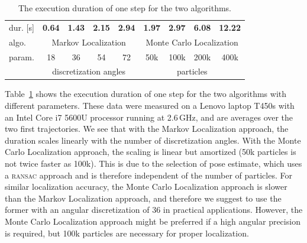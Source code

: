 \documentclass[letterpaper, 10pt, conference]{ieeeconf}
\newcommand{\Fig}[1]{Figure~\ref{fig:#1}}
\newcommand{\Tbl}[1]{{Table}~\ref{fig:#1}}
\begin{document}

\begin{table}
\noindent \begin{tabularx}{\columnwidth}{lcccc|cccc}
\toprule
dur. [s] & \textbf{0.64} & \textbf{1.43} & \textbf{2.15} & \textbf{2.94} & \textbf{1.97} & \textbf{2.97} & \textbf{6.08} & \textbf{12.22} \\
algo. & \multicolumn{4}{c}{Markov Localization} & \multicolumn{4}{c}{Monte Carlo Localization} \\
param. & 18 & 36 & 54 & 72 & 50k & 100k & 200k & 400k \\
& \multicolumn{4}{c}{discretization angles} & \multicolumn{4}{c}{particles} \\
\bottomrule
\end{tabularx}
\caption{The execution duration of one step for the two algorithms.}
\label{fig:cpuload}
\end{table}

\Tbl{cpuload} shows the execution duration of one step for the two algorithms with different parameters.
These data were measured on a Lenovo laptop T450s with an Intel Core i7 5600U processor running at 2.6\,GHz, and are averages over the two first trajectories.
We see that with the Markov Localization approach, the duration scales linearly with the number of discretization angles.
With the Monte Carlo Localization approach, the scaling is linear but amortized (50k particles is not twice faster as 100k).
This is due to the selection of pose estimate, which uses a \textsc{ransac} approach and is therefore independent of the number of particles.
For similar localization accuracy, the Monte Carlo Localization approach is slower than the Markov Localization approach, and therefore we suggest to use the former with an angular discretization of 36 in practical applications.
However, the Monte Carlo Localization approach might be preferred if a high angular precision is required, but 100k particles are necessary for proper localization.

\end{document}
